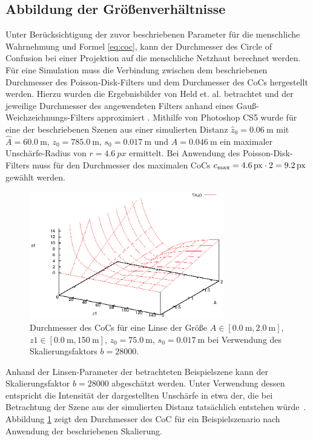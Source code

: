 \documentclass{acmsiggraph}                     %
\begin{document}
\subsection{Abbildung der Größenverhältnisse}
\label{sec:proportions}

Unter Berücksichtigung der zuvor beschriebenen Parameter für die menschliche Wahrnehmung und Formel \ref{eq:coc}, kann der Durchmesser des Circle of Confusion bei einer Projektion auf die menschliche Netzhaut berechnet werden. Für eine Simulation muss die Verbindung zwischen dem beschriebenen Durchmesser des Poisson-Disk-Filters und dem Durchmesser des CoCs hergestellt werden. Hierzu wurden die Ergebnisbilder von Held et. al. betrachtet und der jeweilige Durchmesser des angewendeten Filters anhand eines Gauß-Weichzeichnungs-Filters approximiert \cite{Held:2010cr}. Mithilfe von Photoshop CS5 wurde für eine der beschriebenen Szenen aus einer simulierten Distanz $\hat z_0 = \SI{0.06}{\meter}$ mit $\hat A = \SI{60.0}{\meter}$, $z_0 = \SI{785.0}{\meter}$, $s_0 = \SI{0.017}{\meter}$ und $A = \SI{0.046}{\meter}$ ein maximaler Unschärfe-Radius von $r = \SI{4.6}{px}$ ermittelt. Bei Anwendung des Poisson-Disk-Filters muss für den Durchmesser des maximalen CoCs $c_{\textnormal{max}} = \SI{4.6}{px} \cdot 2 = \SI{9.2}{px}$ gewählt werden.

\begin{figure}[htbp]
\centering
\includegraphics[width=3.35in]{DoF-Graph}
\caption{Durchmesser des CoCs für eine Linse der Größe $A \in [\SI{0.0}{\meter},\SI{2.0}{\meter}]$, $z1 \in [\SI{0.0}{\meter},\SI{150}{\meter}]$, $z_0 = \SI{75.0}{\meter}$, $s_0 =\SI{0.017}{\meter}$ bei Verwendung des Skalierungsfaktors $b = 28000$.}
\label{abb:cocgraph}
\end{figure}

Anhand der Linsen-Parameter der betrachteten Beispielszene kann der Skalierungsfaktor $b = 28000$ abgeschätzt werden. Unter Verwendung dessen entspricht die Intensität der dargestellten Unschärfe in etwa der, die bei Betrachtung der Szene aus der simulierten Distanz tatsächlich entstehen würde~\cite{Held:2010cr}. Abbildung \ref{abb:cocgraph} zeigt den Durchmesser des CoC für ein Beispielszenario nach Anwendung der beschriebenen Skalierung.
\end{document}
